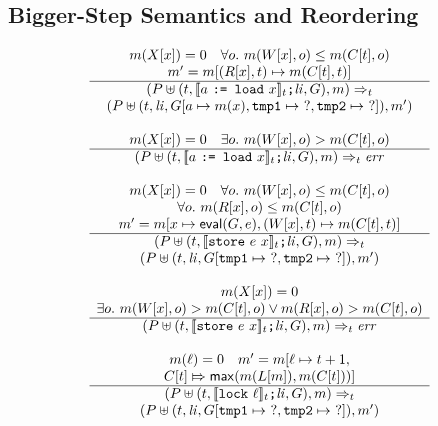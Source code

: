 \documentclass[preprint, 9pt]{sigplanconf}
\newcommand{\meanl}{\ensuremath{[ \! [}}
\newcommand{\meanr}{\ensuremath{] \! ]}}
\newcommand{\means}[1]{\ensuremath{\meanl #1 \meanr}}
\newcommand{\load}[2]{#1\ \texttt{:= load}\ #2}
\newcommand{\store}[2]{\texttt{store}\ #2\ #1}
\newcommand{\lock}[1]{\texttt{lock}\ #1}
\newcommand{\instr}[2]{\ensuremath{\means{#2}_{#1}}}
\newcommand{\cfg}[2]{\ensuremath{(#1, #2)}}
\begin{document}
\subsection{Bigger-Step Semantics and Reordering}
\begin{figure}[t!]
\[
\begin{array}{c}

\multicolumn{1}{c}{m(X[x]) = 0 \quad \forall o.\ m(W[x], o) \le m(C[t], o)}
\\
\multicolumn{1}{c}{m' = m[(R[x], t) \mapsto m(C[t], t)]}
\\
\hline
\cfg{P \uplus (t, \instr{t}{\load{a}{x}}\texttt{;} \mathit{li}, G)}{m}
\Rightarrow_{t} \\
\cfg{P \uplus (t, \mathit{li}, G[a \mapsto m(x), \texttt{tmp1} \mapsto\ ?, \texttt{tmp2} \mapsto\ ?])}{m'}
\\\\

\multicolumn{1}{c}{m(X[x]) = 0 \quad \exists o.\ m(W[x], o) > m(C[t], o)}
\\
\hline
\cfg{P \uplus (t, \instr{t}{\load{a}{x}}\texttt{;} \mathit{li}, G)}{m}
\Rightarrow_{t} \mathit{err}
\\\\

\multicolumn{1}{c}{m(X[x]) = 0 \quad \forall o.\ m(W[x], o) \le m(C[t], o)}
\\
\multicolumn{1}{c}{\forall o.\ m(R[x], o) \le m(C[t], o)}
\\
\multicolumn{1}{c}{m' = m[x \mapsto \mathsf{eval}(G, e), (W[x], t) \mapsto m(C[t], t)]}
\\
\hline
\cfg{P \uplus (t, \instr{t}{\store{x}{e}}\texttt{;} \mathit{li}, G)}{m}
\Rightarrow_{t} \\
\cfg{P \uplus (t, \mathit{li}, G[\texttt{tmp1} \mapsto\ ?, \texttt{tmp2} \mapsto\ ?])}{m'}
\\\\

\multicolumn{1}{c}{m(X[x]) = 0}
\\
\multicolumn{1}{c}{\exists o.\ m(W[x], o) > m(C[t], o) \vee m(R[x], o) > m(C[t], o)}
\\
\hline
\cfg{P \uplus (t, \instr{t}{\store{x}{e}}\texttt{;} \mathit{li}, G)}{m}
\Rightarrow_{t} \mathit{err}
\\\\

\multicolumn{1}{c}{m(\ell) = 0 \quad m' = m[\ell \mapsto t + 1,}
\\
\multicolumn{1}{c}{ C[t] \Mapsto \mathsf{max}(m(L[m]), m(C[t]))]}
\\
\hline
\cfg{P \uplus (t, \instr{t}{\lock{\ell}}\texttt{;} \mathit{li}, G)}{m}
\Rightarrow_{t} \\
\cfg{P \uplus (t, \mathit{li}, G[\texttt{tmp1} \mapsto\ ?, \texttt{tmp2} \mapsto\ ?])}{m'}
\\\\


\end{array}\]
\end{figure}
\end{document}
